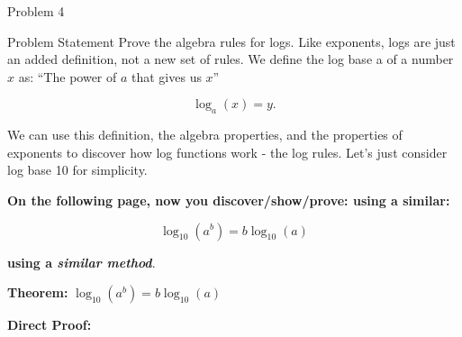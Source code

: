 \begin{problem}{Problem 4}
    \begin{statement}{Problem Statement}
        Prove the algebra rules for logs. Like exponents, logs are just an added definition, not a new set of rules.  We define the log base a of a number $x$ as:  “The power of $a$ that gives us $x$”

        \begin{equation*}
            \log_{a}{(x)} = y.
        \end{equation*}

        We can use this definition, the algebra properties, and the properties of exponents to discover how log functions work - the log rules. Let’s just consider log base 10 for simplicity. \vspace*{1em}

        \textbf{On the following page, now you discover/show/prove: using a similar:}
        
        \begin{equation*}
            \log_{10}({a^{b}}) = b \log_{10}{(a)}
        \end{equation*}
        
        \textbf{using a \textit{similar method}}.
    \end{statement}

    \begin{highlight}[Solution]
        \textbf{Theorem:} $\log_{10}{(a^{b})} = b \log_{10}{(a)}$ \vspace*{1em}

        \textbf{Direct Proof:} \vspace*{1em}


\end{highlight}
\end{problem}
